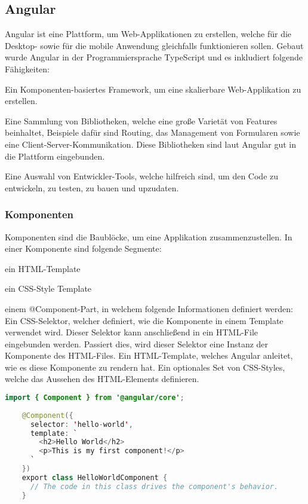 \subsection{Angular}
 
Angular ist eine Plattform, um Web-Applikationen zu erstellen, welche für die Desktop- sowie für die mobile Anwendung gleichfalls funktionieren sollen. Gebaut wurde Angular in der Programmiersprache TypeScript und es inkludiert folgende Fähigkeiten:
 
\begin{compactitem}
    \item Ein Komponenten-basiertes Framework, um eine skalierbare Web-Applikation zu erstellen.
    \item Eine Sammlung von Bibliotheken, welche eine große Varietät von Features beinhaltet, Beispiele dafür sind Routing, das Management von Formularen sowie eine Client-Server-Kommunikation. Diese Bibliotheken sind laut Angular gut in die Plattform eingebunden.
    \item Eine Auswahl von Entwickler-Tools, welche hilfreich sind, um den Code zu entwickeln, zu testen, zu bauen und upzudaten.
\end{compactitem}
 
\subsubsection{Komponenten}
Komponenten sind die Baublöcke, um eine Applikation zusammenzustellen. In einer Komponente sind folgende Segmente:
 
\begin{compactitem}
    \item ein HTML-Template
    \item ein CSS-Style Template
    \item einem @Component-Part, in welchem folgende Informationen definiert werden:
    \subitem Ein CSS-Selektor, welcher definiert, wie die Komponente in einem Template verwendet wird. Dieser Selektor kann anschließend in ein HTML-File eingebunden werden. Passiert dies, wird dieser Selektor eine Instanz der Komponente des HTML-Files.
    \subitem Ein HTML-Template, welches Angular anleitet, wie es diese Komponente zu rendern hat.
    \subitem Ein optionales Set von CSS-Styles, welche das Aussehen des HTML-Elements definieren.
\end{compactitem}
 
\begin{lstlisting}[language=java,caption=Beispiel für eine minimierte Angular Komponente,label=lst:impl:angularBsp]
    import { Component } from '@angular/core';
 
    @Component({
      selector: 'hello-world',
      template: `
        <h2>Hello World</h2>
        <p>This is my first component!</p>
      `
    })
    export class HelloWorldComponent {
      // The code in this class drives the component's behavior.
    }
\end{lstlisting}
 
